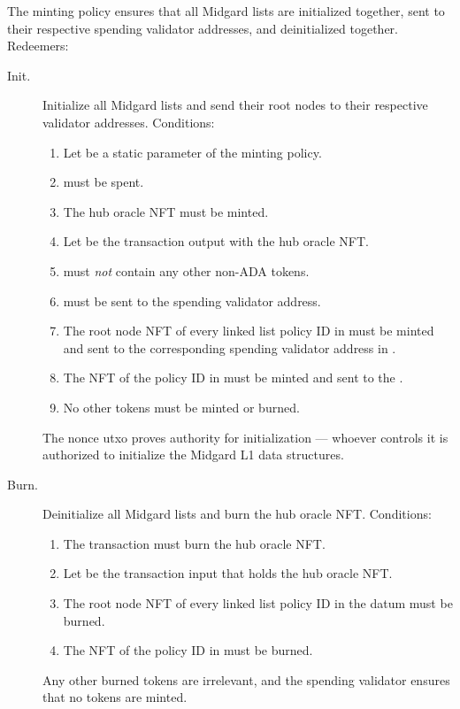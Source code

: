 \documentclass[../midgard.tex]{subfiles}
\begin{document}
The  minting policy ensures that all Midgard lists are initialized together, sent to their respective spending validator addresses, and deinitialized together.
Redeemers:
\begin{description}
    \item[Init.] Initialize all Midgard lists and send their root nodes to their respective validator addresses.
      Conditions:
        \begin{enumerate}
            \item Let  be a static parameter of the  minting policy.
            \item {} must be spent.
            \item The hub oracle NFT must be minted.
            \item Let  be the transaction output with the hub oracle NFT.
            \item {} must \emph{not} contain any other non-ADA tokens.
            \item {} must be sent to the  spending validator address.
            \item The root node NFT of every linked list policy ID in  must be minted and sent to the corresponding spending validator address in .
            \item The NFT of the  policy ID in  must be minted and sent to the .
            \item No other tokens must be minted or burned.
        \end{enumerate}
    The nonce utxo proves authority for initialization --- whoever controls it is authorized to initialize the Midgard L1 data structures.
    
    \item[Burn.] Deinitialize all Midgard lists and burn the hub oracle NFT.
      Conditions:
        \begin{enumerate}
            \item The transaction must burn the hub oracle NFT.
            \item Let  be the transaction input that holds the hub oracle NFT.
            \item The root node NFT of every linked list policy ID in the  datum must be burned.
            \item The NFT of the  policy ID in  must be burned.
        \end{enumerate}
    Any other burned tokens are irrelevant, and the  spending validator ensures that no tokens are minted.
\end{description}
\end{document}
